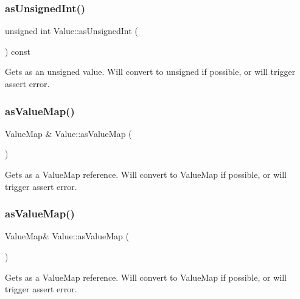 \subsubsection{\texorpdfstring{as\+Unsigned\+Int()}{asUnsignedInt()}\hspace{0.1cm}{\footnotesize\ttfamily [2/2]}}
{\footnotesize\ttfamily unsigned int Value\+::as\+Unsigned\+Int (\begin{DoxyParamCaption}{ }\end{DoxyParamCaption}) const}

Gets as an unsigned value. Will convert to unsigned if possible, or will trigger assert error. \mbox{\label{classValue_a0039826aca674bf2f28e6063963bba29}} 
\subsubsection{\texorpdfstring{as\+Value\+Map()}{asValueMap()}\hspace{0.1cm}{\footnotesize\ttfamily [1/4]}}
{\footnotesize\ttfamily Value\+Map \& Value\+::as\+Value\+Map (\begin{DoxyParamCaption}{ }\end{DoxyParamCaption})}

Gets as a Value\+Map reference. Will convert to Value\+Map if possible, or will trigger assert error. \mbox{\label{classValue_a4f3c384baf951028907e09699d2bb4c9}} 
\subsubsection{\texorpdfstring{as\+Value\+Map()}{asValueMap()}\hspace{0.1cm}{\footnotesize\ttfamily [2/4]}}
{\footnotesize\ttfamily Value\+Map\& Value\+::as\+Value\+Map (\begin{DoxyParamCaption}{ }\end{DoxyParamCaption})}

Gets as a Value\+Map reference. Will convert to Value\+Map if possible, or will trigger assert error. \mbox{\label{classValue_a6a8dbc0909c6982921a7368eb7a6f27b}} 
